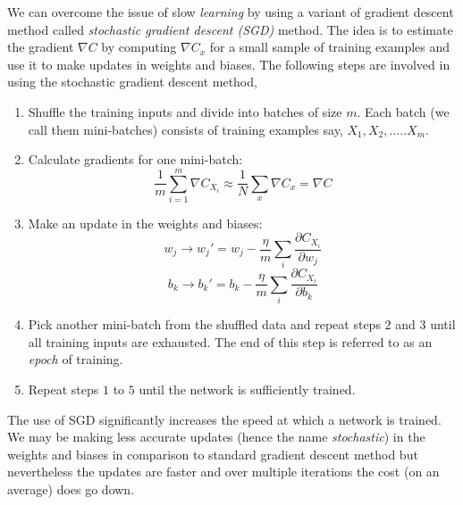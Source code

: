 We can overcome the issue of slow \emph{learning} by using a variant of gradient descent method called \emph{stochastic gradient descent (SGD)} method. The idea is to estimate the gradient
$\nabla C$ by computing $\nabla C_x$ for a small sample of training examples and use it to make updates in weights and biases. The following steps are involved in using the stochastic gradient descent method,
\begin{enumerate}
    \item Shuffle the training inputs and divide into batches of size $m$. Each batch (we call them mini-batches) consists of training examples say, $X_1, X_2, .....X_m$.
    \item Calculate gradients for one mini-batch: $$\frac{1}{m} \sum_{i=1}^{m} \nabla C_{X_i} \approx \frac{1}{N} \sum_x \nabla C_x = \nabla C$$
    \item Make an update in the weights and biases: 
    $$w_j \rightarrow w_j' = w_j - \frac{\eta}{m} \sum_i \frac{\partial C_{X_i}}{\partial w_j}$$
    $$b_k \rightarrow b_k' = b_k - \frac{\eta}{m} \sum_i \frac{\partial C_{X_i}}{\partial b_k}$$
    \item Pick another mini-batch from the shuffled data and repeat steps $2$ and $3$ until all training inputs are exhausted. The end of this step is referred to as an \emph{epoch} of training.
    \item Repeat steps $1$ to $5$ until the network is sufficiently trained.
\end{enumerate}
The use of SGD significantly increases the speed at which a network is trained. We may be making less accurate updates (hence the name \emph{stochastic}) in the weights and biases in comparison to 
standard gradient descent method but nevertheless the updates are faster and over multiple iterations the cost (on an average) does go down. 
